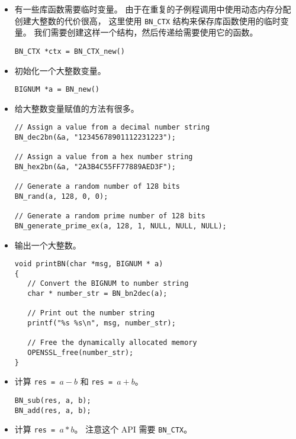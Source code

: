 \begin{itemize}

\item 有一些库函数需要临时变量。
由于在重复的子例程调用中使用动态内存分配创建大整数的代价很高，
这里使用 \texttt{BN\_CTX} 结构来保存库函数使用的临时变量。
我们需要创建这样一个结构，然后传递给需要使用它的函数。

\begin{lstlisting}
BN_CTX *ctx = BN_CTX_new()
\end{lstlisting}


\item 初始化一个大整数变量。

\begin{lstlisting}
BIGNUM *a = BN_new()
\end{lstlisting}


\item 给大整数变量赋值的方法有很多。


\begin{lstlisting}
// Assign a value from a decimal number string
BN_dec2bn(&a, "12345678901112231223");

// Assign a value from a hex number string
BN_hex2bn(&a, "2A3B4C55FF77889AED3F");

// Generate a random number of 128 bits
BN_rand(a, 128, 0, 0);

// Generate a random prime number of 128 bits
BN_generate_prime_ex(a, 128, 1, NULL, NULL, NULL);
\end{lstlisting}


\item 输出一个大整数。

\begin{lstlisting}
void printBN(char *msg, BIGNUM * a)
{
   // Convert the BIGNUM to number string
   char * number_str = BN_bn2dec(a);

   // Print out the number string
   printf("%s %s\n", msg, number_str);

   // Free the dynamically allocated memory
   OPENSSL_free(number_str);
}
\end{lstlisting}


\item 计算 \texttt{res = $a - b$} 和 \texttt{res = $a + b$}。

\begin{lstlisting}
BN_sub(res, a, b);
BN_add(res, a, b);
\end{lstlisting}



\item 计算 \texttt{res = $a * b$}。
注意这个 API 需要 \texttt{BN\_CTX}。


\end{itemize}
